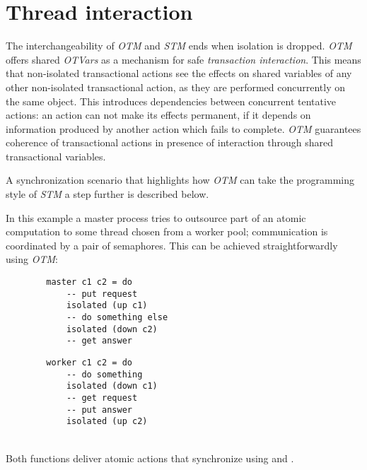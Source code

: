 \section{Thread interaction}

The interchangeability of \emph{OTM} and \emph{STM} ends when isolation is dropped.
\emph{OTM} offers shared \emph{OTVars} as a mechanism for safe \emph{transaction interaction}.
This means that non-isolated transactional actions see the effects on shared variables of any other non-isolated transactional action, as they are performed concurrently on the same object.
This introduces dependencies between concurrent tentative actions: an action can not make its effects permanent, if it depends on information produced by another action which fails to complete.
\emph{OTM} guarantees coherence of transactional actions in presence of interaction through shared transactional variables.

A synchronization scenario that highlights how \emph{OTM} can take the programming style of \emph{STM} a step further is described below.

In this example a master process tries to outsource part of an atomic computation to some thread chosen from a worker pool; communication is coordinated by a pair of semaphores.
This can be achieved straightforwardly using \emph{OTM}:\\


\begin{minipage}{0.45\textwidth}
\begin{Verbatim}
        master c1 c2 = do
            -- put request
            isolated (up c1)
            -- do something else
            isolated (down c2)
            -- get answer
\end{Verbatim}
\end{minipage}
\begin{minipage}{0.45\textwidth}
\begin{Verbatim}
        worker c1 c2 = do
            -- do something
            isolated (down c1)
            -- get request
            -- put answer
            isolated (up c2)
\end{Verbatim}
\end{minipage}
\\

Both functions deliver atomic actions that synchronize using
 and . 

